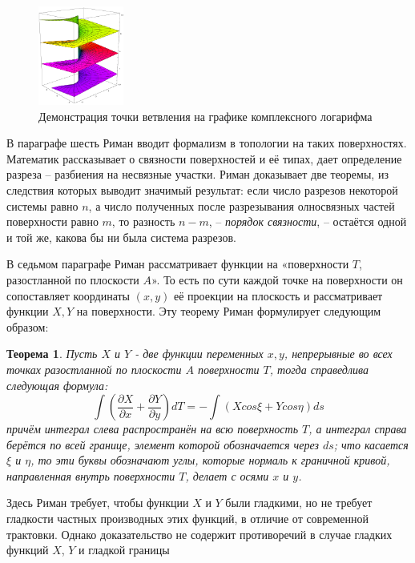 \documentclass[a4paper,12pt]{article}
\newtheorem*{theorem}{Теорема}
\theoremstyle{remark}
\begin{document}
\begin{figure}
  \centering
  \includegraphics[width=0.25\textwidth]{Riemann_surface_log.png}
  \caption{Демонстрация точки ветвления на графике комплексного логарифма}
\end{figure}

В параграфе шесть Риман вводит формализм в топологии на таких поверхностях.
Математик рассказывает о связности поверхностей и её типах, дает определение разреза -- разбиения на несвязные участки.
Риман доказывает две теоремы, из следствия которых выводит значимый результат:
если число разрезов некоторой системы равно $n$, а число полученных после разрезывания
олносвязных частей поверхности равно $m$, то разность $n - m$, -- \textit{порядок связности}, -- остаётся
одной и той же, какова бы ни была система разрезов.

В седьмом параграфе Риман рассматривает функции на «поверхности $T$, разостланной по плоскости $A$».
То есть по сути каждой точке на поверхности он сопоставляет координаты $(x, y)$ её проекции на плоскость и рассматривает функции $X, Y$ на поверхности.
Эту теорему Риман формулирует следующим образом:

\begin{theorem}
  Пусть $X$ и $Y$ - две функции переменных $x, y$, непрерывные во всех точках разостланной по
  плоскости $A$ поверхности $T$, тогда справедлива следующая формула:
  \[ \int \left(\frac{\partial X}{\partial x} + \frac{\partial Y}{\partial y} \right)dT = -\int \left(X cos\xi + Ycos\eta\right)ds \]
  причём интеграл слева распространён на всю поверхность $T$, а интеграл справа берётся по
  всей границе, элемент которой обозначается через $ds$; что касается $\xi$ и $\eta$, то эти буквы
  обозначают углы, которые нормаль к граничной кривой, направленная внутрь поверхности
  $T$, делает с осями $x$ и $y$.
\end{theorem}

Здесь Риман требует, чтобы функции $X $ и $Y$ были гладкими,
но не требует гладкости частных производных этих функций,
в отличие от современной трактовки. Однако доказательство не
содержит противоречий в случае гладких функций $X$, $Y$ и гладкой границы
\end{document}
